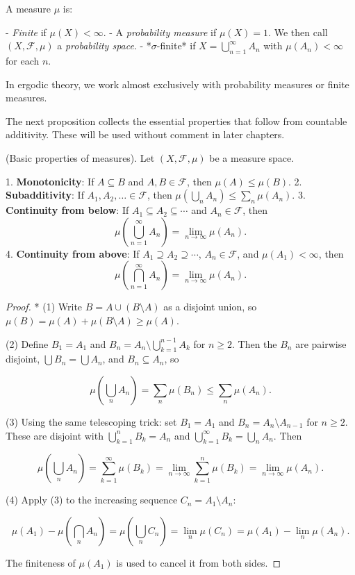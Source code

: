 \begin{definition}\label{def:7.10.}
A measure $\mu$ is:

- \textit{Finite} if $\mu(X) < \infty$.
- A \textit{probability measure} if $\mu(X) = 1$. We then call $(X, \mathcal{F}, \mu)$ a \textit{probability space}.
- *$\sigma$-finite* if $X = \bigcup_{n=1}^\infty A_n$ with $\mu(A_n) < \infty$ for each $n$.

In ergodic theory, we work almost exclusively with probability measures or finite measures.

The next proposition collects the essential properties that follow from countable additivity. These will be used without comment in later chapters.
\end{definition}


\begin{proposition}\label{prop:7.11}
(Basic properties of measures). Let $(X, \mathcal{F}, \mu)$ be a measure space.

1. \textbf{Monotonicity}: If $A \subseteq B$ and $A, B \in \mathcal{F}$, then $\mu(A) \leq \mu(B)$.
2. \textbf{Subadditivity}: If $A_1, A_2, \ldots \in \mathcal{F}$, then $\mu(\bigcup_n A_n) \leq \sum_n \mu(A_n)$.
3. \textbf{Continuity from below}: If $A_1 \subseteq A_2 \subseteq \cdots$ and $A_n \in \mathcal{F}$, then
\[
\mu\!\left(\bigcup_{n=1}^{\infty} A_n\right) = \lim_{n \to \infty} \mu(A_n).
\]
4. \textbf{Continuity from above}: If $A_1 \supseteq A_2 \supseteq \cdots$, $A_n \in \mathcal{F}$, and $\mu(A_1) < \infty$, then
\[
\mu\!\left(\bigcap_{n=1}^{\infty} A_n\right) = \lim_{n \to \infty} \mu(A_n).
\]
\end{proposition}


\begin{proof}
* (1) Write $B = A \cup (B \setminus A)$ as a disjoint union, so $\mu(B) = \mu(A) + \mu(B \setminus A) \geq \mu(A)$.

(2) Define $B_1 = A_1$ and $B_n = A_n \setminus \bigcup_{k=1}^{n-1} A_k$ for $n \geq 2$. Then the $B_n$ are pairwise disjoint, $\bigcup B_n = \bigcup A_n$, and $B_n \subseteq A_n$, so

\[
\mu\!\left(\bigcup_n A_n\right) = \sum_n \mu(B_n) \leq \sum_n \mu(A_n).
\]

(3) Using the same telescoping trick: set $B_1 = A_1$ and $B_n = A_n \setminus A_{n-1}$ for $n \geq 2$. These are disjoint with $\bigcup_{k=1}^n B_k = A_n$ and $\bigcup_{k=1}^\infty B_k = \bigcup_n A_n$. Then

\[
\mu\!\left(\bigcup_n A_n\right) = \sum_{k=1}^{\infty} \mu(B_k) = \lim_{n \to \infty} \sum_{k=1}^{n} \mu(B_k) = \lim_{n \to \infty} \mu(A_n).
\]

(4) Apply (3) to the increasing sequence $C_n = A_1 \setminus A_n$:

\[
\mu(A_1) - \mu\!\left(\bigcap_n A_n\right) = \mu\!\left(\bigcup_n C_n\right) = \lim_n \mu(C_n) = \mu(A_1) - \lim_n \mu(A_n).
\]

The finiteness of $\mu(A_1)$ is used to cancel it from both sides.
\end{proof}


